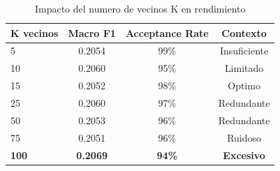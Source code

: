 
\begin{table}[h]
\centering
\caption{Impacto del numero de vecinos K en rendimiento}
\label{tab:k_neighbors}
\begin{tabular}{lccc}
\hline
K vecinos & Macro F1 & Acceptance Rate & Contexto \\
\hline
5 & 0.2054 & 99\% & Insuficiente \\
10 & 0.2060 & 95\% & Limitado \\
15 & 0.2052 & 98\% & Optimo \\
25 & 0.2060 & 97\% & Redundante \\
50 & 0.2053 & 96\% & Redundante \\
75 & 0.2051 & 96\% & Ruidoso \\
\textbf{100} & \textbf{0.2069} & \textbf{94\%} & \textbf{Excesivo} \\

\hline
\end{tabular}
\end{table}

